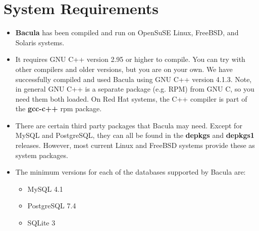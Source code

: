 
\chapter{System Requirements}
\label{SysReqs}

\begin{itemize}
\item {\bf Bacula} has been compiled and run on OpenSuSE Linux, FreeBSD, and
   Solaris systems. 
\item It requires GNU C++ version 2.95 or higher to compile. You can try  with
   other compilers and older versions, but you are on your own.  We have
   successfully compiled and used Bacula using GNU C++ version 4.1.3.
   Note, in general GNU C++ is a separate package (e.g.  RPM) from GNU C, so you
   need them both loaded. On Red Hat systems, the C++ compiler is part of the
   {\bf gcc-c++} rpm package. 
\item There are certain third party packages that Bacula may need.  Except for
   MySQL and PostgreSQL, they can all be found in the  {\bf depkgs} and {\bf
   depkgs1} releases. However, most current Linux and FreeBSD systems
   provide these as system packages.
\item The minimum versions for each of the databases supported by Bacula
   are:

   \begin{itemize}
   \item MySQL 4.1
   \item PostgreSQL 7.4
   \item SQLite 3
   \end{itemize}


\end{itemize}
